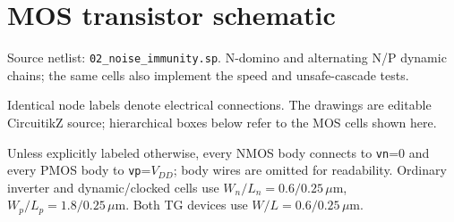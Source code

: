 \clearpage\section{MOS transistor schematic}
\begingroup\small
Source netlist: \texttt{02\_noise\_immunity.sp}. N-domino and alternating N/P dynamic chains; the same cells also implement the speed and unsafe-cascade tests.

Identical node labels denote electrical connections. The drawings are editable CircuitikZ source; hierarchical boxes below refer to the MOS cells shown here.

Unless explicitly labeled otherwise, every NMOS body connects to \texttt{vn}=0 and every PMOS body to \texttt{vp}=\(V_{DD}\); body wires are omitted for readability. Ordinary inverter and dynamic/clocked cells use \(W_n/L_n=0.6/0.25\,\mu\mathrm m\), \(W_p/L_p=1.8/0.25\,\mu\mathrm m\). Both TG devices use \(W/L=0.6/0.25\,\mu\mathrm m\). 

